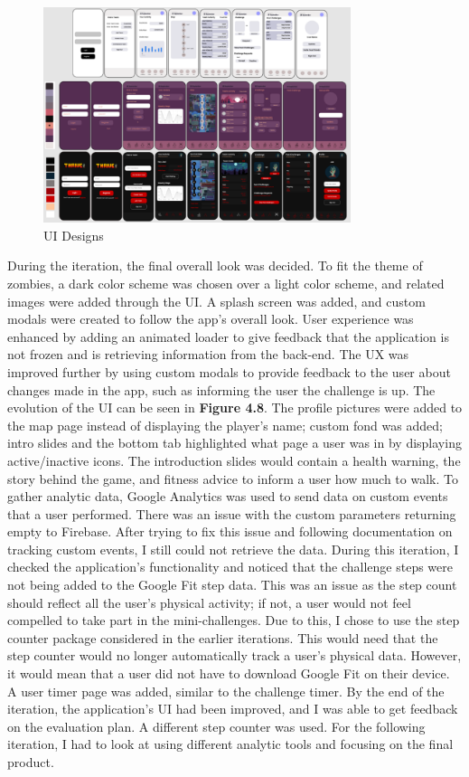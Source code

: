 \documentclass{l4proj}
\begin{document}
  \begin{figure}[h]
    \centering
     \includegraphics[width=90mm]{dissertation/images/10.png}
     \caption{UI Designs}
     \setlength{\belowcaptionskip}{-10pt}
     \label{fig: Forms of exercise}
 \end{figure}

During the iteration, the final overall look was decided. To fit the theme of zombies, a dark color scheme was chosen over a light color scheme, and related images were added through the UI. A splash screen was added, and custom modals were created to follow the app's overall look. 
User experience was enhanced by adding an animated loader to give feedback that the application is not frozen and is retrieving information from the back-end. The UX was improved further by using custom modals to provide feedback to the user about changes made in the app, such as informing the user the challenge is up. The evolution of the UI can be seen in \textbf{Figure 4.8}. The profile pictures were added to the map page instead of displaying the player's name; custom fond was added; intro slides and the bottom tab highlighted what page a user was in by displaying active/inactive icons. The introduction slides would contain a health warning, the story behind the game, and fitness advice to inform a user how much to walk. 
To gather analytic data, Google Analytics was used to send data on custom events that a user performed. There was an issue with the custom parameters returning empty to Firebase. After trying to fix this issue and following documentation on tracking custom events, I still could not retrieve the data. 
During this iteration, I checked the application's functionality and noticed that the challenge steps were not being added to the Google Fit step data. This was an issue as the step count should reflect all the user's physical activity; if not, a user would not feel compelled to take part in the mini-challenges. Due to this, I chose to use the step counter package considered in the earlier iterations. This would need that the step counter would no longer automatically track a user's physical data. However, it would mean that a user did not have to download Google Fit on their device. A user timer page was added, similar to the challenge timer. 
By the end of the iteration, the application's UI had been improved, and I was able to get feedback on the evaluation plan. A different step counter was used. For the following iteration, I had to look at using different analytic tools and focusing on the final product. 
\end{document}
